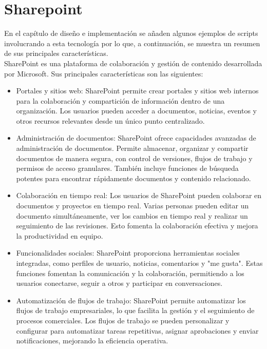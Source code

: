 \documentclass[a4paper, 12pt]{book}
\begin{document}
\section{Sharepoint} 
\label{sec:Sharepoint}

En el capítulo de diseño e implementación se añaden algunos ejemplos de scripts involucrando a esta tecnología por lo que, a continuación, se muestra un resumen de sus principales características.
\\

SharePoint es una plataforma de colaboración y gestión de contenido desarrollada por Microsoft. Sus principales características son las siguientes:

\begin{itemize}

\item Portales y sitios web: SharePoint permite crear portales y sitios web internos para la colaboración y compartición de información dentro de una organización. Los usuarios pueden acceder a documentos, noticias, eventos y otros recursos relevantes desde un único punto centralizado.

\item Administración de documentos: SharePoint ofrece capacidades avanzadas de administración de documentos. Permite almacenar, organizar y compartir documentos de manera segura, con control de versiones, flujos de trabajo y permisos de acceso granulares. También incluye funciones de búsqueda potentes para encontrar rápidamente documentos y contenido relacionado.

\item Colaboración en tiempo real: Los usuarios de SharePoint pueden colaborar en documentos y proyectos en tiempo real. Varias personas pueden editar un documento simultáneamente, ver los cambios en tiempo real y realizar un seguimiento de las revisiones. Esto fomenta la colaboración efectiva y mejora la productividad en equipo.

\item Funcionalidades sociales: SharePoint proporciona herramientas sociales integradas, como perfiles de usuario, noticias, comentarios y "me gusta". Estas funciones fomentan la comunicación y la colaboración, permitiendo a los usuarios conectarse, seguir a otros y participar en conversaciones.

\item Automatización de flujos de trabajo: SharePoint permite automatizar los flujos de trabajo empresariales, lo que facilita la gestión y el seguimiento de procesos comerciales. Los flujos de trabajo se pueden personalizar y configurar para automatizar tareas repetitivas, asignar aprobaciones y enviar notificaciones, mejorando la eficiencia operativa.


\end{itemize}
\end{document}
